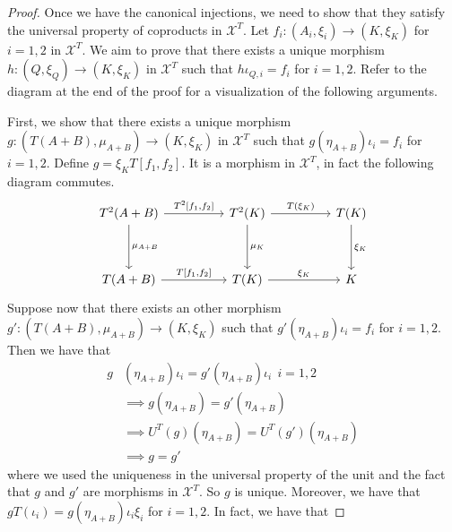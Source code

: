 \begin{subbox}{}
\begin{proof}
        Once we have the canonical injections, we need to show that they satisfy the universal property of coproducts in $\mathcal{X}^T$. Let $f_i:(A_i,\xi_i) \to (K,\xi_K)$ for $i=1,2$ in $\mathcal{X}^T$. We aim to prove that there exists a unique morphism $h:(Q,\xi_Q) \to (K,\xi_K)$ in $\mathcal{X}^T$ such that $h\iota_{Q,i} = f_i$ for $i=1,2$. Refer to the diagram at the end of the proof for a visualization of the following arguments.

        First, we show that there exists a unique morphism $g:(T(A+B),\mu_{A+B}) \to (K,\xi_K)$ in $\mathcal{X}^T$ such that $g(\eta_{A+B})\iota_i=f_i$ for $i=1,2$. Define $g=\xi_K T[f_1,f_2]$. It is a morphism in $\mathcal{X}^T$, in fact the following diagram commutes.
        \[
\begin{tikzcd}
T^2(A+B) \arrow[dd, "\mu_{A+B}"] \arrow[rr, "{T^2[f_1,f_2]}"] &  & T^2(K) \arrow[dd, "\mu_K"] \arrow[rr, "T(\xi_K)"] &  & T(K) \arrow[dd, "\xi_K"] \\
                                                            &  &                                                &  &                          \\
T(A+B) \arrow[rr, "{T[f_1,f_2]}"]                           &  & T(K) \arrow[rr, "\xi_K"]                       &  & K                       
\end{tikzcd}
        \]
        Suppose now that there exists an other morphism $g':(T(A+B),\mu_{A+B}) \to (K,\xi_K)$ such that $g'(\eta_{A+B})\iota_i=f_i$ for $i=1,2$. Then we have that
        \begin{align*}
            g&(\eta_{A+B})\iota_i = g'(\eta_{A+B})\iota_i \ \ i=1,2 \\[1.5ex]
            &\implies g(\eta_{A+B}) = g'(\eta_{A+B}) \\[1.5ex]
            &\implies U^T(g)(\eta_{A+B}) = U^T(g')(\eta_{A+B}) \\[1.5ex]
            &\implies g=g'
        \end{align*}
        where we used the uniqueness in the universal property of the unit and the fact that $g$ and $g'$ are morphisms in $\mathcal{X}^T$. So $g$ is unique. Moreover, we have that $gT(\iota_i) = g (\eta_{A+B}) \iota_i \xi_i$ for $i=1,2$. In fact, we have that

\end{proof}
\end{subbox}
